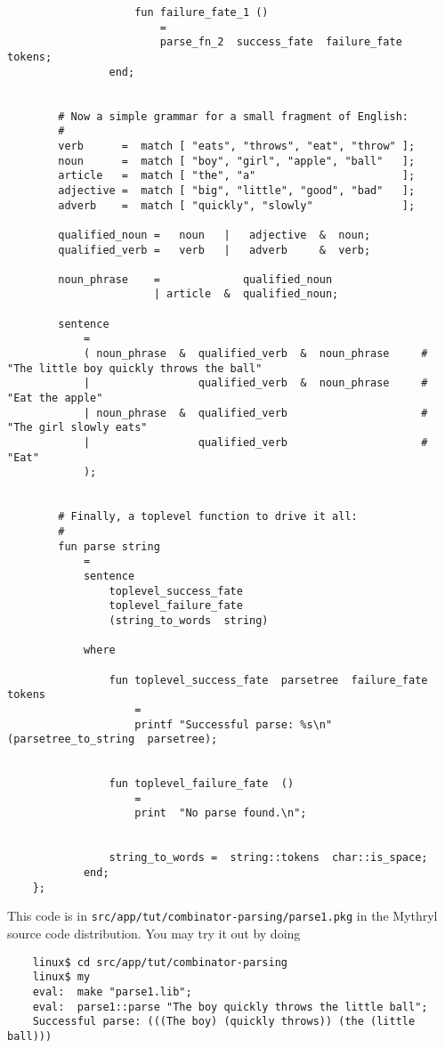 \begin{verbatim}
                    fun failure_fate_1 ()
                        =
                        parse_fn_2  success_fate  failure_fate  tokens;
                end;


        # Now a simple grammar for a small fragment of English:
        #
        verb      =  match [ "eats", "throws", "eat", "throw" ];
        noun      =  match [ "boy", "girl", "apple", "ball"   ];
        article   =  match [ "the", "a"                       ];
        adjective =  match [ "big", "little", "good", "bad"   ];
        adverb    =  match [ "quickly", "slowly"              ];

        qualified_noun =   noun   |   adjective  &  noun;
        qualified_verb =   verb   |   adverb     &  verb;

        noun_phrase    =             qualified_noun
                       | article  &  qualified_noun;

        sentence
            =
            ( noun_phrase  &  qualified_verb  &  noun_phrase     # "The little boy quickly throws the ball"
            |                 qualified_verb  &  noun_phrase     # "Eat the apple"
            | noun_phrase  &  qualified_verb                     # "The girl slowly eats"
            |                 qualified_verb                     # "Eat"
            );


        # Finally, a toplevel function to drive it all:
        #
        fun parse string
            =
            sentence
                toplevel_success_fate
                toplevel_failure_fate
                (string_to_words  string)

            where

                fun toplevel_success_fate  parsetree  failure_fate  tokens
                    =
                    printf "Successful parse: %s\n" (parsetree_to_string  parsetree);


                fun toplevel_failure_fate  ()
                    =
                    print  "No parse found.\n";


                string_to_words =  string::tokens  char::is_space;
            end;
    };
\end{verbatim}

This code is in {\tt src/app/tut/combinator-parsing/parse1.pkg} in the 
Mythryl source code distribution.  You may try it out by doing

\begin{verbatim}
    linux$ cd src/app/tut/combinator-parsing
    linux$ my
    eval:  make "parse1.lib";
    eval:  parse1::parse "The boy quickly throws the little ball";
    Successful parse: (((The boy) (quickly throws)) (the (little ball)))
\end{verbatim}

